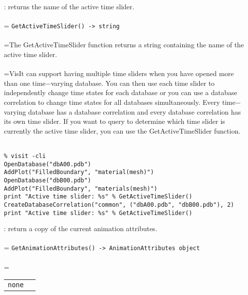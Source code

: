 \documentclass[10pt,a4paper]{report}
\begin{document}
{}
: returns the name of the active time slider.\\[-3mm]

 \\ 
\hangindent=\parindent 
\verb!GetActiveTimeSlider() -> string!\\ [-3mm]

 \\ 
\hangindent=\parindent The GetActiveTimeSlider function returns a string containing the name of the active time slider. \\[-3mm] 

 \\ 
\hangindent=\parindent VisIt can support having multiple time sliders when you have opened more than one time$-$varying database. You can then use each time slider to independently change time states for each database or you can use a database correlation to change time states for all databases simultaneously. Every time$-$varying database has a database correlation and every database correlation has its own time slider. If you want to query to determine which time slider is currently the active time slider, you can use the GetActiveTimeSlider function. \\[-3mm] 

\\[-6mm]
\begin{verbatim}% visit -cli
OpenDatabase("dbA00.pdb")
AddPlot("FilledBoundary", "material(mesh)")
OpenDatabase("dbB00.pdb")
AddPlot("FilledBoundary", "materials(mesh)")
print "Active time slider: %s" % GetActiveTimeSlider()
CreateDatabaseCorrelation("common", ("dbA00.pdb", "dbB00.pdb"), 2)
print "Active time slider: %s" % GetActiveTimeSlider()
\end{verbatim}
\newpage


{}
: return a copy of the current animation attributes.\\[-3mm]

 \\ 
\hangindent=\parindent 
\verb!GetAnimationAttributes() -> AnimationAttributes object!\\ [-3mm]

 \\ 
\hangindent=\parindent 
\begin{tabular}{ll}
\verb!none! &  \\
\end{tabular} \\[-2mm]
\end{document}
